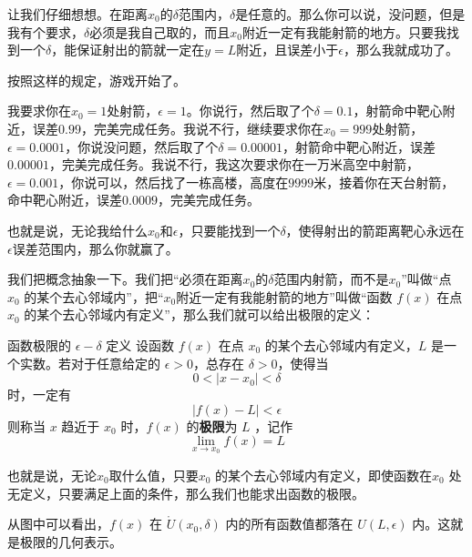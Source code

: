 让我们仔细想想。在距离$x_0$的$\delta$范围内，$\delta$是任意的。那么你可以说，没问题，但是我有个要求，$\delta$必须是我自己取的，而且$x_0$附近一定有我能射箭的地方。只要我找到一个$\delta$，能保证射出的箭就一定在$y = L$附近，且误差小于$\epsilon$，那么我就成功了。

按照这样的规定，游戏开始了。

我要求你在$x_0=1$处射箭，$\epsilon=1$。你说行，然后取了个$\delta=0.1$，射箭命中靶心附近，误差$0.99$，完美完成任务。我说不行，继续要求你在$x_0=999$处射箭，$\epsilon=0.0001$，你说没问题，然后取了个$\delta=0.00001$，射箭命中靶心附近，误差$0.00001$，完美完成任务。我说不行，我这次要求你在一万米高空中射箭，$\epsilon=0.001$，你说可以，然后找了一栋高楼，高度在$9999$米，接着你在天台射箭，命中靶心附近，误差$0.0009$，完美完成任务。

也就是说，无论我给什么$x_0$和$\epsilon $，只要能找到一个$\delta$，使得射出的箭距离靶心永远在$\epsilon$误差范围内，那么你就赢了。

我们把概念抽象一下。我们把“必须在距离$x_0$的$\delta$范围内射箭，而不是$x_0$”叫做“点 $x_0$ 的某个去心邻域内”，把“$x_0$附近一定有我能射箭的地方”叫做“函数 $f(x)$ 在点 $x_0$ 的某个去心邻域内有定义”，那么我们就可以给出极限的定义：

\begin{definition}{函数极限的 $\epsilon-\delta$ 定义}{}
设函数 $f(x)$ 在点 $x_0$ 的某个去心邻域内有定义，$L$ 是一个实数。若对于任意给定的 $\epsilon > 0$，总存在 $\delta > 0$，使得当
\[
0 < |x - x_0| < \delta
\]
时，一定有
\[
|f(x) - L| < \epsilon
\]
则称当 $x$ 趋近于 $x_0$ 时，$f(x)$ 的\textbf{极限}为 $L$ ，记作
\[
\lim_{x \to x_0} f(x) = L
\]
\end{definition}

也就是说，无论$x_0$取什么值，只要$x_0$ 的某个去心邻域内有定义，即使函数在$x_0$ 处无定义，只要满足上面的条件，那么我们也能求出函数的极限。

从图中可以看出，$f(x)$ 在 $\mathring{U}(x_0, \delta)$ 内的所有函数值都落在 $U(L, \epsilon)$ 内。这就是极限的几何表示。


